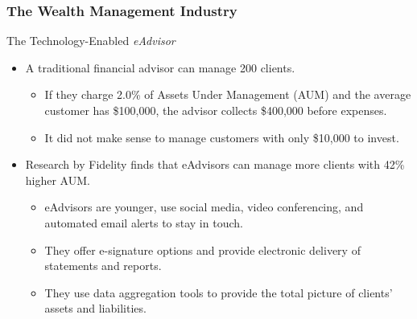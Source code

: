 \begin{frame}
\frametitle{The Wealth Management Industry}


\vspace{-2mm}
The Technology-Enabled \textit{eAdvisor}
\begin{itemize}
    \item A traditional financial advisor can manage 200 clients. 
    \begin{itemize}
        \item If they charge 2.0\% of Assets Under Management (AUM) and the average customer has \$100,000, the advisor collects \$400,000 before expenses.
        \item It did not make sense to manage customers with only \$10,000 to invest.
    \end{itemize}
    \item Research by Fidelity finds that eAdvisors can manage more clients with 42\% higher AUM.
    \begin{itemize}
        \item eAdvisors are younger, use social media, video conferencing, and automated email alerts to stay in touch.
        \item They offer e-signature options and provide electronic delivery of statements and reports.
        \item They use data aggregation tools to provide the total picture of clients’ assets and liabilities.
    \end{itemize}
\end{itemize}



\end{frame} 





